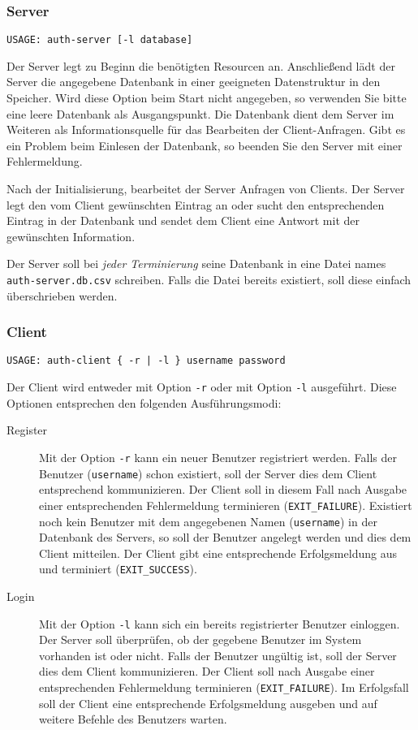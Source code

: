 \subsubsection*{Server}
\begin{verbatim}
USAGE: auth-server [-l database]
\end{verbatim}

Der Server legt zu Beginn die benötigten Resourcen an. Anschließend lädt der
Server die angegebene Datenbank in einer geeigneten Datenstruktur in den
Speicher. Wird diese Option beim Start nicht angegeben, so verwenden Sie bitte
eine leere Datenbank als Ausgangspunkt. Die Datenbank dient dem Server im
Weiteren als Informationsquelle für das Bearbeiten der Client-Anfragen. Gibt es
ein Problem beim Einlesen der Datenbank, so beenden Sie den Server mit einer
Fehlermeldung.

Nach der Initialisierung, bearbeitet der Server Anfragen von Clients. Der
Server legt den vom Client gewünschten Eintrag an oder sucht den entsprechenden
Eintrag in der Datenbank und sendet dem Client eine Antwort mit der gewünschten
Information.

Der Server soll bei \textit{jeder Terminierung} seine Datenbank in eine Datei
names \texttt{auth-server.db.csv} schreiben. Falls die Datei bereits existiert,
soll diese einfach überschrieben werden.

\subsubsection*{Client}
\begin{verbatim}
USAGE: auth-client { -r | -l } username password
\end{verbatim}

Der Client wird entweder mit Option \texttt{-r} oder mit Option \texttt{-l}
ausgeführt. Diese Optionen entsprechen den folgenden Ausführungsmodi:

\begin{description}
  \item[Register] Mit der Option \texttt{-r} kann ein neuer Benutzer
    registriert werden. Falls der Benutzer (\texttt{username}) schon existiert,
    soll der Server dies dem Client entsprechend kommunizieren. Der Client soll
    in diesem Fall nach Ausgabe einer entsprechenden Fehlermeldung terminieren
    (\texttt{EXIT\_FAILURE}).  Existiert noch kein Benutzer mit dem angegebenen
    Namen (\texttt{username}) in der Datenbank des Servers, so soll der
    Benutzer angelegt werden und dies dem Client mitteilen. Der Client gibt
    eine entsprechende Erfolgsmeldung aus und terminiert
    (\texttt{EXIT\_SUCCESS}).
  \item[Login] Mit der Option \texttt{-l} kann sich ein
    bereits registrierter Benutzer einloggen. Der Server soll überprüfen, ob
    der gegebene Benutzer im System vorhanden ist oder nicht. Falls der
    Benutzer ungültig ist, soll der Server dies dem Client kommunizieren. Der
    Client soll nach Ausgabe einer entsprechenden Fehlermeldung terminieren
    (\texttt{EXIT\_FAILURE}).  Im Erfolgsfall soll der Client eine
    entsprechende Erfolgsmeldung ausgeben und auf weitere Befehle des Benutzers
    warten.
\end{description}

